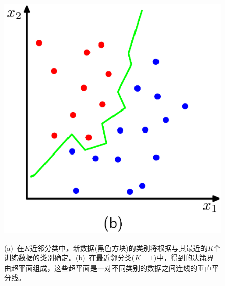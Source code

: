 \documentclass[b5paper]{book}
\numberwithin{equation}{chapter}
\begin{document}
{\begin{figure}[ht]
\begin{minipage}[t]{0.5\linewidth}
		\label{fig:2-27a}
		\end{minipage}
		\begin{minipage}[t]{0.5\linewidth}
		\centering
		\includegraphics[scale=0.8]{Images/2-27b.png}
		\label{fig:2-27b}
		\end{minipage}
		\caption{(a)\ 在$K$近邻分类中，新数据(黑色方块)的类别将根据与其最近的$K$个训练数据的类别确定。(b)\ 在最近邻分类($K=1$)中，得到的决策界由超平面组成，这些超平面是一对不同类别的数据之间连线的垂直平分线。}
		\begin{minipage}[t]{0.3\linewidth}
		\centering

\end{minipage}
\end{figure}}
\end{document}
